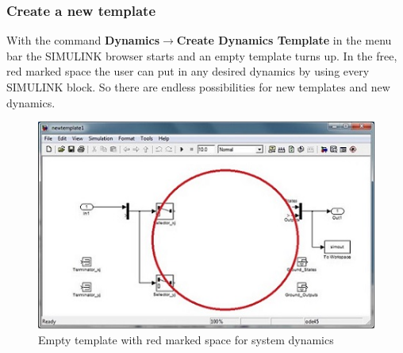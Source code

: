 \documentclass[12pt]{report}
\begin{document}
\subsubsection{Create a new template}
With the command \textbf{Dynamics$\rightarrow$Create Dynamics Template} in the menu bar the SIMULINK browser starts and an empty template turns up. In the free, red marked space the user can put in any desired dynamics by using every SIMULINK block. So there are endless possibilities for new templates and new dynamics.\\
\begin{figure}[h]
\centering
\includegraphics[scale=.5]{template2}
\caption{Empty template with red marked space for system dynamics}
\label{FIG:abb39}
\end{figure}
\\
\\
\\
\\
\\
\\
\\
\\
\\
\\
\\
\\
\end{document}
